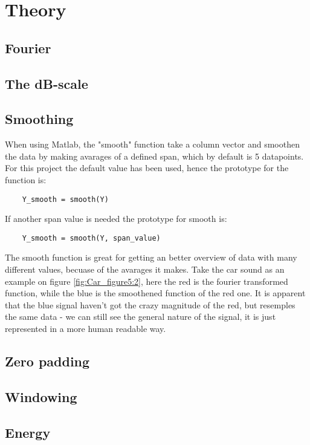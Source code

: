 \section{Theory}

\subsection{Fourier}

\subsection{The dB-scale}

\subsection{Smoothing}

When using Matlab, the "smooth" function take a column vector and smoothen the data by making avarages of a defined span, which by default is 5 datapoints. For this project the default value has been used, hence the prototype for the function is:

\begin{verbatim}
	Y_smooth = smooth(Y)
\end{verbatim}

If another span value is needed the prototype for smooth is:


\begin{verbatim}
	Y_smooth = smooth(Y, span_value)
\end{verbatim}

The smooth function is great for getting an better overview of data with many different values, becuase of the avarages it makes. 
Take the car sound as an example on figure \ref{fig:Car_figure5:2}, here the red is the fourier transformed function, while the blue is the smoothened function of the red one. It is apparent that the blue signal haven't got the crazy magnitude of the red, but resemples the same data - we can still see the general nature of the signal, it is just represented in a more human readable way.

\subsection{Zero padding}

\subsection{Windowing}

\subsection{Energy}